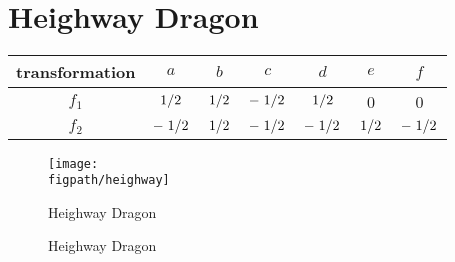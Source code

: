 \documentclass[12pt,a4paper]{article}
\newcommand{\figpath}{../fig}
\begin{document}
    \section{Heighway Dragon}
    \begin{table}
        \centering
        \begin{tabular}{|c|c|c|c|c|c|c|}
            \hline
            transformation & $a$ & $b$ & $c$ & $d$ & $e$ & $f$ \\
            \hline
            $f_1$ & $\flatfrac{1}{2}$ & $\flatfrac{1}{2}$ & $-\flatfrac{1}{2}$ & $\flatfrac{1}{2}$ & 0 & 0 \\
            \hline
            $f_2$ & $-\flatfrac{1}{2}$ & $\flatfrac{1}{2}$ & $-\flatfrac{1}{2}$ & $-\flatfrac{1}{2}$ & $\flatfrac{1}{2}$ & $-\flatfrac{1}{2}$ \\
            \hline
        \end{tabular}
    \end{table}
    \begin{figure}
        \centering
        \texttt{[image: \\figpath/heighway]}
        \caption{Heighway Dragon}
    \end{figure}
    \begin{figure}
        \centering
        \caption{Heighway Dragon}
    \end{figure}
\end{document}

